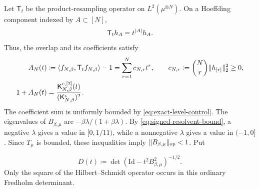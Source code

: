 \documentclass[11pt,reqno]{amsart}
\numberwithin{equation}{section}
\theoremstyle{plain}
\theoremstyle{remark}
\DeclarePairedDelimiter{\abs}{\lvert}{\rvert}
\DeclarePairedDelimiter{\norm}{\lVert}{\rVert}
\DeclarePairedDelimiter{\ipp}{\langle}{\rangle}
\newcommand{\K}{{\mathsf{K}}}
\newcommand{\be}{\beta}
\begin{document}
Let $\mathsf T_t$ be the product-resampling operator on $L^2(\mu^{\otimes N})$.  On a Hoeffding component indexed by $A\subset[N]$,
\begin{equation}\label{eq:exact-noise-eigenvalue}
 \mathsf T_t h_A=t^{\abs A}h_A.
\end{equation}
Thus, the overlap and its coefficients satisfy
\begin{align}
 A_N(t)&\coloneqq\ipp*{f_{N,\be},\mathsf T_tf_{N,\be}}-1
 =\sum_{r=1}^N c_{N,r}t^r,
 \qquad c_{N,r}\coloneqq\binom Nr\norm{h_{[r]}}_2^2\geq0,
 \label{eq:exact-noise-series}\\
 1+A_N(t)&=\frac{\K^{\mathrm c,[2]}_{N,\be}(t)}{(\K^{\mathrm c}_{N,\be})^2}.
 \label{eq:exact-overlap-ratio}
\end{align}
The coefficient sum is uniformly bounded by \eqref{eq:exact-level-control}.
The eigenvalues of $B_{\be,\mu}$ are $-\be\lambda/(1+\be\lambda)$.
By \eqref{eq:signed-resolvent-bound}, a negative $\lambda$ gives a value
in $[0,1/11)$, while a nonnegative $\lambda$ gives a value in $(-1,0]$.
Since $T_\mu$ is bounded, these inequalities imply
$\norm{B_{\be,\mu}}_{\mathrm{op}}<1$.  Put

\begin{equation}\label{eq:exact-overlap-limit}
 D(t)\coloneqq\det(\mathrm{Id}-t^2B_{\be,\mu}^2)^{-1/2}.
\end{equation}
Only the square of the Hilbert--Schmidt operator occurs in this ordinary Fredholm determinant.
\end{document}
